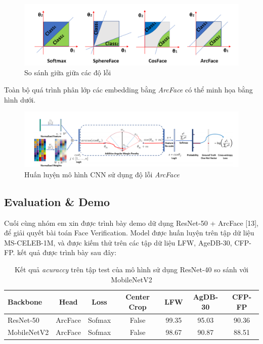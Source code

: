 \documentclass[a4paper, 12pt]{article}
\begin{document}
\begin{figure}[H]
    \begin{center}
        \includegraphics[scale=0.5]{img/loss-cmp}
        \caption{So sánh giữa giữa các độ lỗi}
    \end{center}
\end{figure}

Toàn bộ quá trình phân lớp các embedding bằng \textit{ArcFace} có thể minh họa bằng hình dưới. 

\begin{figure}[H]
    \begin{center}
        \includegraphics[scale=0.3]{img/arcface-full}
        \caption{Huấn luyện mô hình CNN sử dụng độ lỗi \textit{ArcFace}}
    \end{center}
\end{figure}

\subsection{Evaluation \& Demo}
Cuối cùng nhóm em xin được trình bày demo dữ dụng ResNet-50 + ArcFace [13], để  giải quyết bài toán Face Verification. Model được huấn luyện trên tập dữ liệu MS-CELEB-1M, và được kiếm thử trên các tập dữ liệu LFW, AgeDB-30, CFP-FP. kết quả được trình bày sau đây: 

    \begin{table}[H]
        \centering
        \begin{tabular}{|l|c|c|c|c|c|c|}
        \hline
        Backbone & Head     & Loss & Center Crop & LFW & AgDB-30 & CFP-FP\\ \hline
        ResNet-50   & ArcFace & Sofmax & False & 99.35 & 95.03 & 90.36\\ \hline
        MobileNetV2 & ArcFace & Sofmax & False & 98.67 & 90.87 & 88.51\\ \hline
        \end{tabular}
        \caption{Kết quả \textit{acuraccy} trên tập test của mô hình sử dụng ResNet-40 so sánh với MobileNetV2}
    \end{table}
\end{document}
